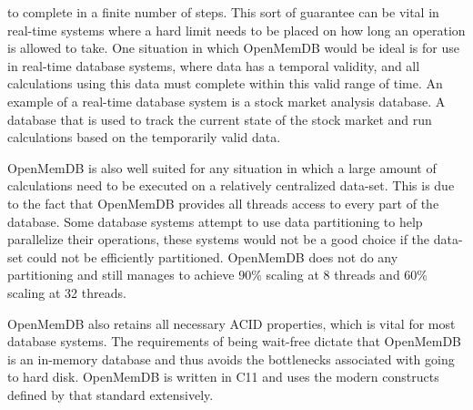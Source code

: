 \documentclass[conference, compsoc]{IEEEtran}
\newcommand{\CC}{C\nolinebreak\hspace{-.05em}\raisebox{.4ex}{\tiny\bf +}\nolinebreak\hspace{-.10em}\raisebox{.4ex}{\tiny\bf +}}
\begin{document}
to complete in a finite number of steps. This sort of guarantee can be vital in 
real-time systems where a hard limit needs to be placed on how long an operation 
is allowed to take. One situation in which OpenMemDB would be ideal is for use in real-time 
database systems, where data has a temporal validity, and all calculations using this data 
must complete within this valid range of time. An example of a real-time database system 
is a stock market analysis database. A database that is used to track the current state
of the stock market and run calculations based on the temporarily valid data. 
\par\vspace{\baselineskip}
OpenMemDB
is also well suited for any situation in which a large amount of calculations need to be 
executed on a relatively centralized data-set. This is due to the fact that OpenMemDB 
provides all threads access to every part of the database. Some database systems attempt to 
use data partitioning to help parallelize their operations, these systems would not be a 
good choice if the data-set could not be efficiently partitioned. OpenMemDB does not do any 
partitioning and still manages to achieve 90\% scaling at 8 threads and 60\% scaling at 32 
threads. 
\par\vspace{\baselineskip}
OpenMemDB also 
retains all necessary ACID properties, which is vital for most database systems. 
The requirements of being wait-free dictate that 
OpenMemDB is an in-memory database and thus avoids the bottlenecks associated with 
going to hard disk. OpenMemDB is written in \CC 11 and uses the modern constructs defined by 
that standard extensively.
\par\vspace{\baselineskip}
\end{document}
